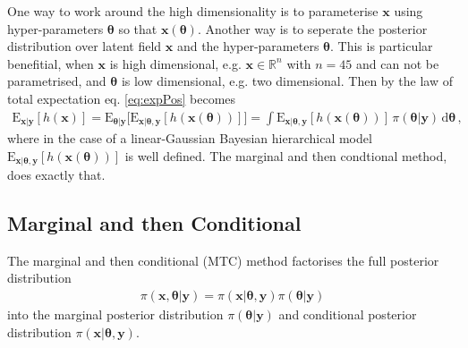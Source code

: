 One way to work around the high dimensionality is to parameterise $\bm{x}$ using hyper-parameters $\bm{\theta}$ so that $\bm{x}(\bm{\theta})$. 
Another way is to seperate the posterior distribution over latent field $\bm{x}$ and the hyper-parameters $\bm{\theta}$.
This is particular benefitial, when $\bm{x}$ is high dimensional, e.g. $\bm{x} \in \mathbb{R}^n$ with $n = 45$ and can not be parametrised, and $\bm{\theta}$ is low dimensional, e.g. two dimensional.
Then by the law of total expectation eq. \ref{eq:expPos} becomes
\begin{align}
	\text{E}_{\bm{x}|\bm{y}} [h(\bm{x})] = \text{E}_{\bm{\theta}|\bm{y}}   \big[ \text{E}_{\bm{x}|\bm{\theta},\bm{y}} [h(\bm{x}(\bm{\theta}))] \big]=  \int 	\text{E}_{\bm{x}| \bm{\theta},\bm{y}}  [h(\bm{x}(\bm{\theta}))] \,  \pi( \bm{\theta} | \bm{y} )  \, \text{d} \bm{\theta}   \label{eq:MargExpPos} \, ,
\end{align}
where in the case of a linear-Gaussian Bayesian hierarchical model $\text{E}_{\bm{x}| \bm{\theta},\bm{y}}  [h(\bm{x}(\bm{\theta}))]$ is well defined.
The marginal and then condtional method, does exactly that.


\subsection{Marginal and then Conditional}
\label{subsec:MTC}
The marginal and then conditional (MTC) method factorises the full posterior distribution 
\begin{align}
	\pi(\bm{x}, \bm{\theta}|\bm{y}) = \pi(\bm{x}| \bm{\theta}, \bm{y}) \pi(\bm{\theta}|\bm{y})
\end{align}
into the marginal posterior distribution $ \pi(\bm{\theta}|\bm{y})$ and conditional posterior distribution $\pi(\bm{x}| \bm{\theta}, \bm{y})$.


